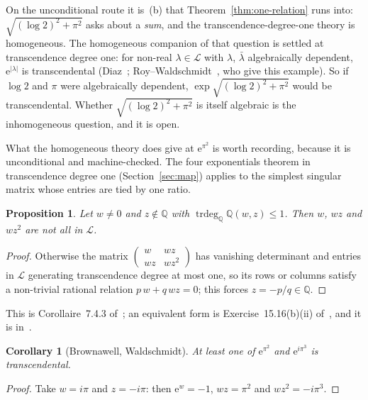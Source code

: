 \documentclass[11pt,a4paper]{article}
\theoremstyle{plain}
\newtheorem{corollary}[theorem]{Corollary}
\newtheorem{proposition}[theorem]{Proposition}
\theoremstyle{definition}
\newcommand{\e}{\mathrm{e}}
\newcommand{\Q}{\mathbb{Q}}
\newcommand{\Logs}{\mathcal{L}}
\DeclareMathOperator{\trdeg}{trdeg}
\begin{document}
On the unconditional route it is~(b) that Theorem~\ref{thm:one-relation} runs into:
$\sqrt{(\log 2)^{2}+\pi^{2}}$ asks about a \emph{sum}, and the transcendence-degree-one theory is
homogeneous. The homogeneous companion of that question is settled at transcendence degree one: for
non-real $\lambda\in\Logs$ with $\lambda$, $\bar\lambda$ algebraically dependent,
$\e^{|\lambda|}$ is transcendental (Diaz~\cite[Proposition~2]{diaz-1997};
Roy--Waldschmidt~\cite[Cor.~7.4]{roy-waldschmidt-1997}, who give this example). So if $\log2$ and
$\pi$ were algebraically dependent, $\exp\sqrt{(\log2)^{2}+\pi^{2}}$ would be transcendental.
Whether $\sqrt{(\log2)^{2}+\pi^{2}}$ is itself algebraic is the inhomogeneous question, and it is
open.

What the homogeneous theory does give at $\e^{\pi^{2}}$ is worth recording, because it is
unconditional and machine-checked. The four exponentials theorem in transcendence degree one
(Section~\ref{sec:map}) applies to the simplest singular matrix whose entries are tied by one ratio.

\begin{proposition}\label{prop:geometric}
Let $w\neq0$ and $z\notin\Q$ with $\trdeg_{\Q}\Q(w,z)\le1$. Then $w$, $wz$ and $wz^{2}$ are not
all in $\Logs$.
\end{proposition}

\begin{proof}
Otherwise the matrix $\begin{pmatrix}w&wz\\ wz&wz^{2}\end{pmatrix}$ has vanishing determinant and
entries in $\Logs$ generating transcendence degree at most one, so its rows or columns satisfy a
non-trivial rational relation $p\,w+q\,wz=0$; this forces $z=-p/q\in\Q$.
\end{proof}

This is Corollaire~7.4.3 of~\cite{waldschmidt-1974}; an equivalent form is
Exercise~15.16(b)(ii) of~\cite{waldschmidt-book}, and it is in~\cite[p.~241]{diaz-1997}.

\begin{corollary}[Brownawell, Waldschmidt]\label{cor:epi2}
At least one of $\e^{\pi^{2}}$ and $\e^{i\pi^{3}}$ is transcendental.
\end{corollary}

\begin{proof}
Take $w=i\pi$ and $z=-i\pi$: then $\e^{w}=-1$, $wz=\pi^{2}$ and $wz^{2}=-i\pi^{3}$.
\end{proof}
\end{document}
